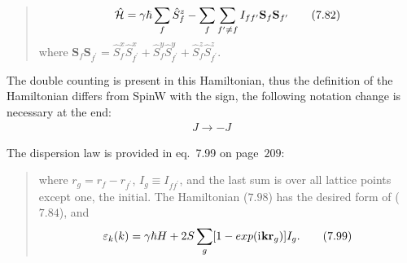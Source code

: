     \begin{quote}
        \begin{equation}
            \hat{\mathcal{H}} = \gamma\hbar\sum_{f}\hat{S}_f^z - \sum_f\sum_{f^{\prime} \ne f} I_{ff^{\prime}}\mathbf{S}_f\mathbf{S}_{f^{\prime}} \label{eq:moaw-7.82} \tag{7.82}
        \end{equation}
        where $\mathbf{S}_f\mathbf{S}_{f^{\prime}} = \hat{S}_f^x\hat{S}_{f^{\prime}}^x + \hat{S}_f^y\hat{S}_{f^{\prime}}^y + \hat{S}_f^z\hat{S}_{f^{\prime}}^z$.
    \end{quote}
    The double counting is present in this Hamiltonian, thus the definition of the Hamiltonian differs from SpinW with the sign, the following notation change is necessary at the end:
    \begin{equation}
        \begin{matrix} 
            J \rightarrow -J
        \end{matrix}
    \end{equation}

    The dispersion law is provided in eq.~7.99 on page~$209$:
    \begin{quote}
        where $r_g = r_f - r_{f^{\prime}}$, $I_g \equiv I_{ff^{\prime}}$, and the last sum is over all lattice points except one, the initial. 
        The Hamiltonian ($7.98$) has the desired form of ($7.84$), and
        \begin{equation}
            \varepsilon_k(k) = \gamma\hbar H + 2S \sum_g [1 - exp(\mathrm{i}\mkern1mu \mathbf{k}\mathbf{r}_g)]I_g. \label{eq:moaw-7.99} \tag{7.99}
        \end{equation}
    \end{quote}

